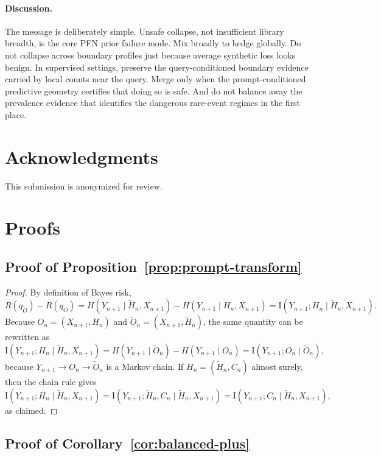 \documentclass{article}
\theoremstyle{definition}
\theoremstyle{remark}
\newcommand{\I}{\mathrm{I}}
\begin{document}
\paragraph{Discussion.}

The message is deliberately simple. Unsafe collapse, not insufficient library breadth, is the core PFN prior failure mode. Mix broadly to hedge globally. Do not collapse across boundary profiles just because average synthetic loss looks benign. In supervised settings, preserve the query-conditioned boundary evidence carried by local counts near the query. Merge only when the prompt-conditioned predictive geometry certifies that doing so is safe. And do not balance away the prevalence evidence that identifies the dangerous rare-event regimes in the first place.

\section*{Acknowledgments}

This submission is anonymized for review.

\appendix

\section{Proofs}

\subsection{Proof of Proposition~\ref{prop:prompt-transform}}

\begin{proof}
By definition of Bayes risk,
\[
R(q_{\widetilde O})-R(q_O)
=
H(Y_{n+1}\mid \widetilde H_n,X_{n+1})-H(Y_{n+1}\mid H_n,X_{n+1})
=
\I(Y_{n+1};H_n\mid \widetilde H_n,X_{n+1}).
\]
Because $O_n=(X_{n+1},H_n)$ and $\widetilde O_n=(X_{n+1},\widetilde H_n)$, the same quantity can be rewritten as
\[
\I(Y_{n+1};H_n\mid \widetilde H_n,X_{n+1})
=
H(Y_{n+1}\mid \widetilde O_n)-H(Y_{n+1}\mid O_n)
=
\I(Y_{n+1};O_n\mid \widetilde O_n),
\]
because $Y_{n+1}\to O_n\to \widetilde O_n$ is a Markov chain. If $H_n=(\widetilde H_n,C_n)$ almost surely, then the chain rule gives
\[
\I(Y_{n+1};H_n\mid \widetilde H_n,X_{n+1})
=
\I(Y_{n+1};\widetilde H_n,C_n\mid \widetilde H_n,X_{n+1})
=
\I(Y_{n+1};C_n\mid \widetilde H_n,X_{n+1}),
\]
as claimed.
\end{proof}

\subsection{Proof of Corollary~\ref{cor:balanced-plus}}
\end{document}

